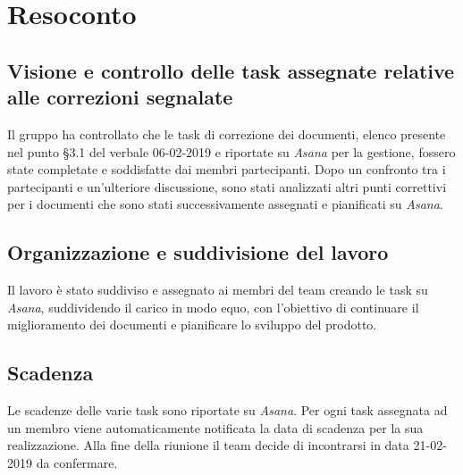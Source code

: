 \clearpage
\section{Resoconto}
	\subsection{Visione e controllo delle task assegnate relative alle correzioni segnalate}
	\label{sec:visione_controllo}
	Il gruppo ha controllato che le task di correzione dei documenti, elenco presente nel punto §3.1 del verbale 06-02-2019 e riportate su \textit{Asana} per la gestione, fossero state completate e soddisfatte dai membri partecipanti. 
	Dopo un confronto tra i partecipanti e un'ulteriore discussione, sono stati analizzati altri punti correttivi per i documenti che sono stati successivamente assegnati e pianificati su \textit{Asana}.
	\subsection{Organizzazione e suddivisione del lavoro}
	\label{sec:organizzazione}
	Il lavoro è stato suddiviso e assegnato ai membri del team creando le task su \textit{Asana}, suddividendo il carico in modo equo, con l'obiettivo di continuare il miglioramento dei documenti e pianificare lo sviluppo del prodotto.
	\subsection{Scadenza}
	\label{sec:scadenza}
	Le scadenze delle varie task sono riportate su \textit{Asana}. Per ogni task assegnata ad un membro viene automaticamente notificata la data di scadenza per la sua realizzazione.
	Alla fine della riunione il team decide di incontrarsi in data 21-02-2019 da confermare.

